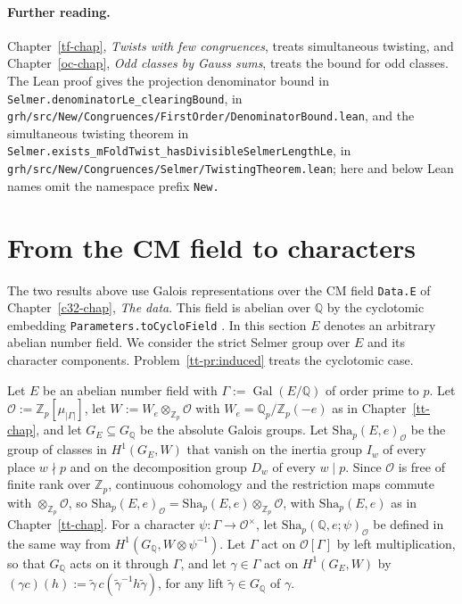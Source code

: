 \documentclass[reqno]{amsart}
\newcounter{chap}
\theoremstyle{definition}
\theoremstyle{plain}
\newcommand{\Z}{\mathbb{Z}}
\newcommand{\Q}{\mathbb{Q}}
\newcommand{\Zp}{\Z_p}
\newcommand{\Oc}{\mathcal{O}}
\newcommand{\Gal}{\operatorname{Gal}}
\newcommand{\Sha}{\mathrm{Sha}}
\begin{document}
\paragraph{Further reading.}
Chapter~\ref{tf-chap}, \emph{Twists with few congruences}, treats simultaneous twisting, and Chapter~\ref{oc-chap}, \emph{Odd classes by Gauss sums}, treats the bound for odd classes.  The Lean proof \cite{GL} gives the projection denominator bound in \texttt{Selmer.denominatorLe\_clearingBound}, in \texttt{grh/src/New/Congruences/FirstOrder/DenominatorBound.lean}, and the simultaneous twisting theorem in \texttt{Selmer.exists\_mFoldTwist\_hasDivisibleSelmerLengthLe}, in \texttt{grh/src/New/Congruences/Selmer/TwistingTheorem.lean}; here and below Lean names omit the namespace prefix \texttt{New.}

\section{From the CM field to characters}\label{sec:shapiro}

The two results above use Galois representations over the CM field \texttt{Data.E} of Chapter~\ref{c32-chap}, \emph{The data}.  This field is abelian over \(\Q\) by the cyclotomic embedding \texttt{Parameters.toCycloField} \cite{GL}.  In this section \(E\) denotes an arbitrary abelian number field.  We consider the strict Selmer group over \(E\) and its character components.  Problem~\ref{tt-pr:induced} treats the cyclotomic case.

Let \(E\) be an abelian number field with \(\Gamma := \Gal(E/\Q)\) of order prime to \(p\).  Let \(\Oc := \Zp[\mu_{\lvert\Gamma\rvert}]\), let \(W := W_e \otimes_{\Zp} \Oc\) with \(W_e = \mathbb{Q}_p/\Zp(-e)\) as in Chapter~\ref{tt-chap}, and let \(G_E \subseteq G_\Q\) be the absolute Galois groups.  Let \(\Sha_p(E, e)_\Oc\) be the group of classes in \(H^1(G_E, W)\) that vanish on the inertia group \(I_w\) of every place \(w \nmid p\) and on the decomposition group \(D_w\) of every \(w \mid p\).  Since \(\Oc\) is free of finite rank over \(\Zp\), continuous cohomology and the restriction maps commute with \(\otimes_{\Zp} \Oc\), so \(\Sha_p(E, e)_\Oc = \Sha_p(E, e) \otimes_{\Zp} \Oc\), with \(\Sha_p(E, e)\) as in Chapter~\ref{tt-chap}.  For a character \(\psi \colon \Gamma \to \Oc^\times\), let \(\Sha_p(\Q, e; \psi)_\Oc\) be defined in the same way from \(H^1(G_\Q, W \otimes \psi^{-1})\).  Let \(\Gamma\) act on \(\Oc[\Gamma]\) by left multiplication, so that \(G_\Q\) acts on it through \(\Gamma\), and let \(\gamma \in \Gamma\) act on \(H^1(G_E, W)\) by \((\gamma c)(h) := \tilde\gamma\, c(\tilde\gamma^{-1} h \tilde\gamma)\), for any lift \(\tilde\gamma \in G_\Q\) of \(\gamma\).
\end{document}
